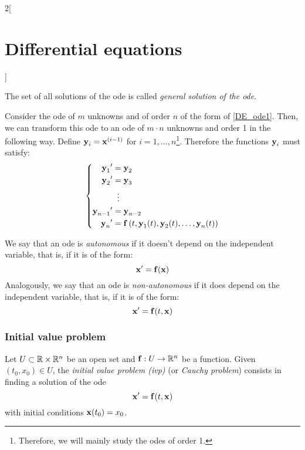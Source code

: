 \documentclass[../../../main.tex]{subfiles}
\begin{document}
\begin{multicols}{2}[\section{Differential equations}]
\begin{definition}
\begin{itemize}
    \end{itemize}
    The set of all solutions of the ode is called \textit{general solution of the ode}.
  \end{definition}
  \begin{prop}
    Consider the ode of $m$ unknowns and of order $n$ of the form of \eqref{DE_ode1}. Then, we can transform this ode to an ode of $m\cdot n$ unknowns and order 1 in the following way. Define $\boldsymbol{\mathrm{y}}_i=\boldsymbol{\mathrm{x}}^{(i-1)}$ for $i=1,\ldots,n$\footnote{Therefore, we will mainly study the odes of order 1.}. Therefore the functions $\boldsymbol{\mathrm{y}}_i$ must satisfy:
    \begin{equation*}
      \left\{
      \begin{aligned}
        {\boldsymbol{\mathrm{y}}_1}'     & =\boldsymbol{\mathrm{y}}_2                                                                                            \\
        {\boldsymbol{\mathrm{y}}_2}'     & =\boldsymbol{\mathrm{y}}_3                                                                                            \\
                                    & \;\;\vdots                                                                                                       \\
        {\boldsymbol{\mathrm{y}}_{n-1}}' & =\boldsymbol{\mathrm{y}}_{n-2}                                                                                        \\
        {\boldsymbol{\mathrm{y}}_n}'     & =\boldsymbol{\mathrm{f}}\left(t,\boldsymbol{\mathrm{y}}_1(t),\boldsymbol{\mathrm{y}}_2(t),\ldots,\boldsymbol{\mathrm{y}}_n(t)\right) \\
      \end{aligned}
      \right.
    \end{equation*}
  \end{prop}
  \begin{definition}
    We say that an ode is \textit{autonomous} if it doesn't depend on the independent variable, that is, if it is of the form: $$\boldsymbol{\mathrm{x}}'=\boldsymbol{\mathrm{f}}(\boldsymbol{\mathrm{x}})$$ Analogously, we say that an ode is \textit{non-autonomous} if it does depend on the independent variable, that is, if it is of the form: $$\boldsymbol{\mathrm{x}}'=\boldsymbol{\mathrm{f}}(t,\boldsymbol{\mathrm{x}})$$
  \end{definition}
  \subsubsection{Initial value problem}
  \begin{definition}
    Let $U\subset\mathbb{R}\times\mathbb{R}^n$ be an open set and $\boldsymbol{\mathrm{f}}:U\rightarrow\mathbb{R}^n$ be a function. Given $(t_0,x_0)\in U$, the \textit{initial value problem (ivp)} (or \textit{Cauchy problem}) consists in finding a solution of the ode $$\boldsymbol{\mathrm{x}}'=\boldsymbol{\mathrm{f}}(t,\boldsymbol{\mathrm{x}})$$ with initial conditions $\boldsymbol{\mathrm{x}}(t_0)=x_0$.
  \end{definition}

\end{multicols}
\end{document}
